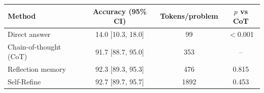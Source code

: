 \begin{tabular}{lccc}
\toprule
Method & Accuracy (95\% CI) & Tokens/problem & $p$ vs CoT \\
\midrule
Direct answer & 14.0 [10.3, 18.0] & 99 & $<$0.001 \\
Chain-of-thought (CoT) & 91.7 [88.7, 95.0] & 353 & -- \\
Reflection memory & 92.3 [89.3, 95.3] & 476 & 0.815 \\
Self-Refine & 92.7 [89.7, 95.7] & 1892 & 0.453 \\
\bottomrule
\end{tabular}
